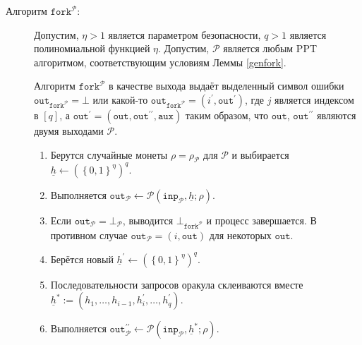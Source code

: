 \documentclass{mrl}
\theoremstyle{definition}
\numberwithin{theorem}{subsection}
\begin{document}
\begin{description}
\item [Алгоритм $\texttt{fork}^{\mathcal{P}}$:] Допустим, $\eta > 1$ является параметром безопасности, $q > 1$ является полиномиальной функцией $\eta$. Допустим, $\mathcal{P}$ является любым PPT алгоритмом, соответствующим условиям Леммы \ref{genfork}.



Алгоритм $\texttt{fork}^{\mathcal{P}}$ в качестве выхода выдаёт выделенный символ ошибки $\texttt{out}_{\texttt{fork}^{\mathcal{P}}} = \bot$ или какой-то $\texttt{out}_{\texttt{fork}^{\mathcal{P}}} = (i^\prime, \texttt{out}^\prime)$, где $j$ является индексом в $[q]$, а $\texttt{out}^\prime = (\texttt{out}, \texttt{out}^{\prime\prime}, \texttt{aux})$ таким образом, что $\texttt{out}$, $\texttt{out}^{\prime\prime}$ являются двумя выходами $\mathcal{P}$.

\begin{enumerate}
\item Берутся случайные монеты $\rho=\rho_\mathcal{P}$ для $\mathcal{P}$ и выбирается $\underline{h} \leftarrow (\left\{0,1\right\}^{\eta})^q$.

\item Выполняется $\texttt{out}_\mathcal{P} \leftarrow \mathcal{P}(\texttt{inp}_{\mathcal{P}}, \underline{h}; \rho)$.

\item Если $\texttt{out}_\mathcal{P} = \bot_\mathcal{P}$, выводится $\bot_{\texttt{fork}^{\mathcal{P}}}$ и процесс завершается. В противном случае $\texttt{out}_{\mathcal{P}} = (i, \texttt{out})$ для некоторых $\texttt{out}$.

\item Берётся новый $\underline{h}^\prime \leftarrow (\left\{0,1\right\}^\eta)^q$.

\item Последовательности запросов оракула склеиваются вместе $\underline{h}^* := (h_1, \ldots, h_{i-1}, h^\prime_i, \ldots, h^\prime_q)$.

\item Выполняется $\texttt{out}_{\mathcal{P}}^{\prime \prime} \leftarrow \mathcal{P}(\texttt{inp}_{\mathcal{P}}, \underline{h}^*; \rho)$.


\end{enumerate}
\end{description}
\end{document}
